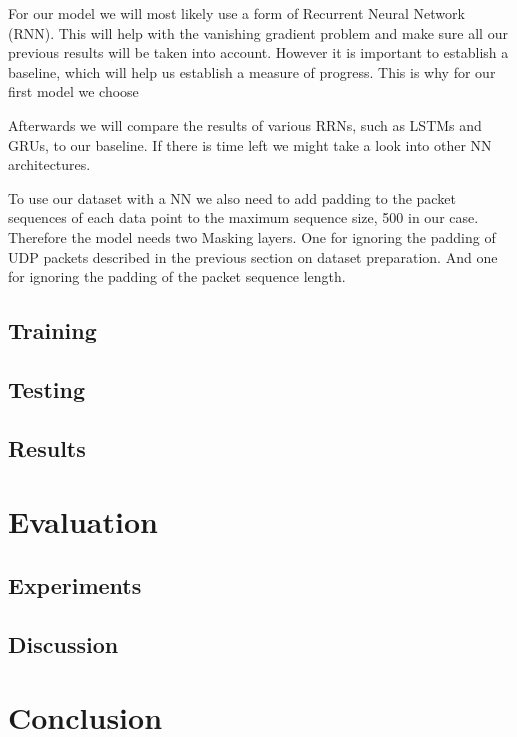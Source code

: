 \documentclass[
	ngerman,
	ruledheaders=section,%
	class=report,%
	thesis={type=bachelor},%
	accentcolor=9c,%
	custommargins=true,%
	marginpar=false,%
	parskip=half-,%
	fontsize=11pt,%
]{tudapub}
\begin{document}

For our model we will most likely use a form of Recurrent Neural Network (RNN).
This will help with the vanishing gradient problem and make sure all our previous results will be taken into account.
However it is important to establish a baseline, which will help us establish a measure of progress. %
This is why for our first model we choose %

Afterwards we will compare the results of various RRNs, such as LSTMs and GRUs, to our baseline.
If there is time left we might take a look into other NN architectures. %

To use our dataset with a NN we also need to add padding to the packet sequences of each data point to the maximum sequence size, 500 in our case.
Therefore the model needs two Masking layers.
One for ignoring the padding of UDP packets described in the previous section on dataset preparation.
And one for ignoring the padding of the packet sequence length.


\section{Training}

\section{Testing}

\section{Results}

\chapter{Evaluation}

\section{Experiments}

\section{Discussion}

\chapter{Conclusion}
\end{document}
